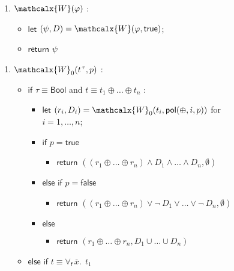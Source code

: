 \documentclass[runningheads,a4paper]{llncs}
\newcommand{\con}[1]{\mathsf{#1}}
\renewcommand\vec[1]{\overline{#1}}
\let\oldneg=\neg
\def\neg{\oldneg\:}
\newcommand{\conv}{\mathcalx{W}}
\newcommand{\ptrue}{\con{true}}
\newcommand{\pfalse}{\con{false}}
\newcommand{\pol}{\con{pol}}
\newcommand{\Bool}{\con{Bool}}
\newcommand{\boolop}{\oplus}
\newcommand{\forallf}[1]{\forall_{\!#1\:}}
\newcommand{\vthinspace}{\kern+0.083333em}
\newcommand{\typ}[1]{^{\vthinspace #1}}
\begin{document}
\begin{figure}[t]
\begin{enumerate}
\item[\ ] 
$\conv( \varphi )$ : 
 \begin{itemize}
   \item[] $\mathsf{let}$ $( \psi, D ) = \conv( \varphi, \ptrue )$;
   \item[] $\mathsf{return}$ $\psi$
  \end{itemize}
\end{enumerate}
\begin{enumerate}
\item[\ ] 
$\conv_0( t\typ{\tau}, p )$ : 
 \begin{itemize}
   \item[] $\mathsf{if}$ $\tau \equiv \Bool$ and $t \equiv t_1 \boolop \ldots \boolop t_n$ :
    \begin{itemize}
      \item[] $\mathsf{let}$ $( r_i, D_i ) = \conv_0( t_i, \pol( \boolop, i, p ) )$ for $i = 1, \ldots, n$;
      \item[] $\mathsf{if}$ $p = \ptrue$
      \begin{itemize}
        \item[] $\mathsf{return}$ $( ( r_1 \boolop \ldots \boolop r_n ) \wedge D_1 \wedge \ldots \wedge D_n, \emptyset )$
      \end{itemize}
      \item[] $\mathsf{else}$ $\mathsf{if}$ $p = \pfalse$
      \begin{itemize}
        \item[] $\mathsf{return}$ $( ( r_1 \boolop \ldots \boolop r_n ) \vee \neg D_1 \vee \ldots \vee \neg D_n, \emptyset )$
      \end{itemize}
      \item[] $\mathsf{else}$
      \begin{itemize}
        \item[] $\mathsf{return}$ $( r_1 \boolop \ldots \boolop r_n, D_1 \cup \ldots \cup D_n )$
      \end{itemize}
    \end{itemize}
  \item[] $\mathsf{else}$ $\mathsf{if}$ $t \equiv \forallf{\con{f}} \vec x.\;\, t_1$
    \begin{itemize}

\end{itemize}
\end{itemize}
\end{enumerate}
\end{figure}
\end{document}
